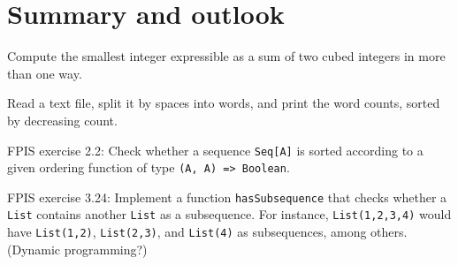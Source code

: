 
\chapter{Summary and outlook}

Compute the smallest integer expressible as a sum of two cubed integers
in more than one way.

Read a text file, split it by spaces into words, and print the word
counts, sorted by decreasing count.

FPIS exercise 2.2: Check whether a sequence \lstinline!Seq[A]! is
sorted according to a given ordering function of type \lstinline!(A, A) => Boolean!.

FPIS exercise 3.24: Implement a function \lstinline!hasSubsequence!
that checks whether a \lstinline!List! contains another \lstinline!List!
as a subsequence. For instance, \lstinline!List(1,2,3,4)! would have
\lstinline!List(1,2)!, \lstinline!List(2,3)!, and \lstinline!List(4)!
as subsequences, among others. (Dynamic programming?)
